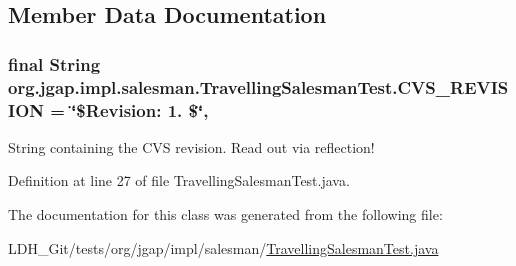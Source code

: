 \subsection{Member Data Documentation}
\hypertarget{classorg_1_1jgap_1_1impl_1_1salesman_1_1_travelling_salesman_test_a1494566bfd9ee87beb671b28751814c9}{
\subsubsection[{C\-V\-S\-\_\-\-R\-E\-V\-I\-S\-I\-O\-N}]{\setlength{\rightskip}{0pt plus 5cm}final String org.\-jgap.\-impl.\-salesman.\-Travelling\-Salesman\-Test.\-C\-V\-S\-\_\-\-R\-E\-V\-I\-S\-I\-O\-N = \char`\"{}\$Revision\-: 1. \$\char`\"{}\hspace{0.3cm}{\ttfamily [static]}, {\ttfamily [private]}}}\label{classorg_1_1jgap_1_1impl_1_1salesman_1_1_travelling_salesman_test_a1494566bfd9ee87beb671b28751814c9}
String containing the C\-V\-S revision. Read out via reflection! 

Definition at line 27 of file Travelling\-Salesman\-Test.\-java.



The documentation for this class was generated from the following file\-:\begin{DoxyCompactItemize}
\item 
L\-D\-H\-\_\-\-Git/tests/org/jgap/impl/salesman/\hyperlink{_travelling_salesman_test_8java}{Travelling\-Salesman\-Test.\-java}\end{DoxyCompactItemize}
